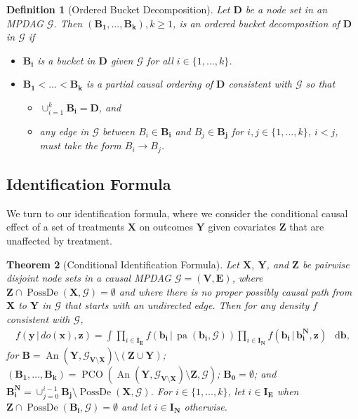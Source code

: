 \documentclass[11pt]{article}
\DeclareMathOperator{\An}{An}
\DeclareMathOperator{\pa}{pa}
\DeclareMathOperator{\PossDe}{PossDe}
\DeclareMathOperator{\PCO}{PCO}
\newtheorem{theorem}{Theorem}
\newtheorem{definition}[theorem]{Definition}
\newcommand{\mb}[1]{\mathbf{#1}}
\newcommand{\g}[1][G]{\mathcal{#1}}
\newcommand*\diff{\mathop{}\!\mathrm{d}}
\begin{document}
\begin{definition}[Ordered Bucket Decomposition]
\label{def:obd}
    Let $\mb{D}$ be a node set in an MPDAG $\g$. Then $(\mb{B_1}, \dots, \mb{B_k}), k \ge 1$, is an ordered bucket decomposition of $\mb{D}$ in $\g$ if
    \begin{itemize}
        \item $\mb{B_i}$ is a bucket in $\mb{D}$ given $\g$ for all $i \in \{ 1, \dots, k\}$.
        \item $\mb{B_1} < \dots < \mb{B_k}$ is a partial causal ordering of $\mb{D}$ consistent with $\g$ so that
        \begin{itemize}
            \item $\cup_{i=1}^k \mb{B_i} = \mb{D}$, and
            \item any edge in $\g$ between $B_i \in \mb{B_i}$ and $B_j \in \mb{B_j}$ for $i,j \in \{1, \dots, k\}$, $i<j$, must take the form $B_i \to B_j$.
        \end{itemize}
    \end{itemize}
\end{definition}






\subsection{Identification Formula}
\label{sec:id-formula}

We turn to our identification formula, where we consider the conditional causal effect of a set of treatments $\mb{X}$ on outcomes $\mb{Y}$ given covariates $\mb{Z}$ that are unaffected by treatment.


\begin{theorem}[Conditional Identification Formula]
\label{thm:id-formula}
    Let $\mb{X}$, $\mb{Y}$, and $\mb{Z}$ be pairwise disjoint node sets in a causal MPDAG $\g =(\mb{V,E})$, where $\mb{Z} \cap \PossDe(\mb{X},\g) = \emptyset$ and where there is no proper possibly causal path from $\mb{X}$ to $\mb{Y}$ in $\g$ that starts with an undirected edge. Then for any density $f$ consistent with $\g$,
    \begin{align}
        f(\mb{y} \,|\, do(\mb{x}),\mb{z}) = \int \prod_{i\in \mb{I_E}} f(\mb{b_i} \,|\, \pa(\mb{b_i},\g)) \prod_{i \in \mb{I_N}} f(\mb{b_i} \,|\, \mb{b_i^N}, \mb{z}) \ \diff \mb{b}, \label{eq:id-formula}
    \end{align}
    for ${\mb{B} =\An(\mb{Y}, \g_{\mb{V} \setminus \mb{X}}) \setminus (\mb{Z} \cup \mb{Y})}$; ${(\mb{B_1}, \dots, \mb{B_k}) = \PCO(\An(\mb{Y}, \g_{\mb{V} \setminus \mb{X}}) \setminus \mb{Z}, \g)}$; ${\mb{B_0} = \emptyset}$; and $\mb{B_i^N}= \cup_{j=0}^{i-1}\mb{B_j} \setminus \PossDe(\mb{X},\g)$. For ${i \in \{1, \dots, k\}}$, let ${i \in \mb{I_E}}$ when ${\mb{Z} \cap \PossDe(\mb{B_i}, \g) = \emptyset}$ and let ${i \in \mb{I_N}}$ otherwise.
\end{theorem}
\end{document}
